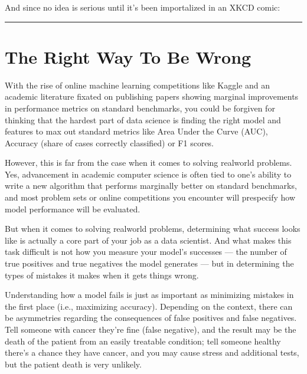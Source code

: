 \documentclass[letterpaper,10pt,english]{jupyterBook}
\begin{document}
\sphinxAtStartPar
And since no idea is serious until it’s been importalized in an XKCD comic:

\sphinxAtStartPar
{}


\bigskip\hrule\bigskip


\sphinxstepscope


\chapter{The Right Way To Be Wrong}
\label{\detokenize{30_questions/26_passive_prediction_errors:the-right-way-to-be-wrong}}\label{\detokenize{30_questions/26_passive_prediction_errors::doc}}
\sphinxAtStartPar
With the rise of online machine learning competitions like Kaggle and an academic literature fixated on publishing papers showing marginal improvements in performance metrics on standard benchmarks, you could be forgiven for thinking that the hardest part of data science is finding the right model and features to max out standard metrics like Area Under the Curve (AUC), Accuracy (share of cases correctly classified) or F1 scores.

\sphinxAtStartPar
However, this is far from the case when it comes to solving real\sphinxhyphen{}world problems. Yes, advancement in academic computer science is often tied to one’s ability to write a new algorithm that performs marginally better on standard benchmarks, and most problem sets or online competitions you encounter will pre\sphinxhyphen{}specify how model performance will be evaluated.

\sphinxAtStartPar
But when it comes to solving real\sphinxhyphen{}world problems, determining what success looks like is actually a core part of your job as a data scientist. And what makes this task difficult is not how you measure your model’s successes — the number of true positives and true negatives the model generates — but in determining the types of mistakes it makes when it gets things wrong.

\sphinxAtStartPar
Understanding how a model fails is just as important as minimizing mistakes in the first place (i.e., maximizing accuracy). Depending on the context, there can be  asymmetries regarding the consequences of false positives and false negatives. Tell someone with cancer they’re fine (false negative), and the result may be the death of the patient from an easily treatable condition; tell someone healthy there’s a chance they have cancer, and you may cause stress and additional tests, but the patient death is very unlikely.
\end{document}
